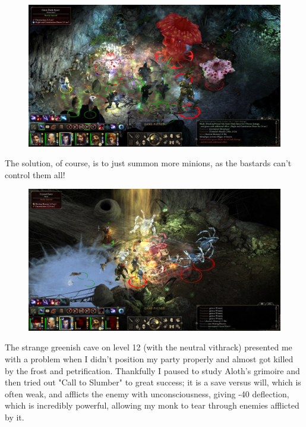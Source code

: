 \documentclass{article}
\begin{document}
\begin{figure}
\includegraphics[scale=0.33]{files/blog/2018_11_25_pillars_of_eternity_path_of_the_damned_act_ii/2018_11_25_paths_l11_2.jpg}
\end{figure}

The solution, of course, is to just summon more minions, as the bastards can't control them all!

\begin{figure}
\includegraphics[scale=0.33]{files/blog/2018_11_25_pillars_of_eternity_path_of_the_damned_act_ii/2018_11_25_paths_l12.jpg}
\end{figure}

The strange greenish cave on level 12 (with the neutral vithrack) presented me with a problem when I didn't position my party properly and almost got killed by the frost and petrification.  Thankfully I paused to study Aloth's grimoire and then tried out "Call to Slumber" to great success; it is a save versus will, which is often weak, and afflicts the enemy with unconsciousness, giving -40 deflection, which is incredibly powerful, allowing my monk to tear through enemies afflicted by it.
\end{document}
